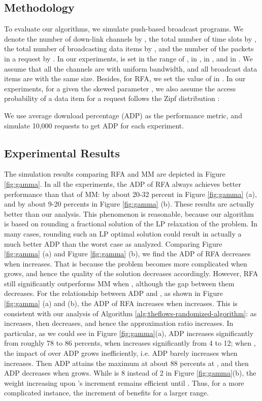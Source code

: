 \documentclass[11pt,english,onecolumn,draftcls]{IEEEtran}
\theoremstyle{plain}
\theoremstyle{plain}
\theoremstyle{plain}
\theoremstyle{plain}
\begin{document}
\subsection{Methodology}

To evaluate our algorithms, we simulate push-based broadcast programs.
We denote the number of down-link channels by , the total number
of time slots by , the total number of broadcasting data items
by , and the number of the packets in a request by . In our
experiments,  is set in the range of ,  in ,
 in , and  in . We assume that
all the channels are with uniform bandwidth, and all broadcast data
items are with the same size. Besides, for RFA, we set the value of
 in . In our experiments, for a given the skewed
parameter , we also assume the access probability of a data
item  for a request follows the Zipf distribution :




We use average download percentage (ADP) as the performance metric,
and simulate 10,000 requests to get ADP for each experiment.


\subsection{Experimental Results }

The simulation results comparing RFA and MM are depicted in Figure
\ref{fig:gamma}. In all the experiments, the ADP of RFA always achieves
better performance than that of MM: by about 20-32 percent in Figure
\ref{fig:gamma} (a), and by about 9-20 percents in Figure \ref{fig:gamma}
(b). These results are actually better than our analysis. This phenomenon
is reasonable, because our algorithm is based on rounding a fractional
solution of the LP relaxation of the problem. In many cases, rounding
such an LP optimal solution could result in actually a much better
ADP than the worst case as analyzed. Comparing Figure \ref{fig:gamma}
(a) and Figure \ref{fig:gamma} (b), we find the ADP of RFA decreases
when  increases. That is because the problem becomes more complicated
when  grows, and hence the quality of the solution decreases accordingly.
However, RFA still significantly outperforms MM when , although
the gap between them decreases. For the relationship between ADP and
, as shown in Figure \ref{fig:gamma} (a) and (b), the ADP
of RFA increases when  increases. This is consistent with
our analysis of Algorithm \ref{alg:theflows-randomized-algorithm}:
as  increases,  then decreases,
and hence the approximation ratio  increases.
In particular, as we could see in Figure \ref{fig:gamma}(a), ADP
increases significantly from roughly 78 to 86 percents, when 
increases significantly from 4 to 12; when , the impact
of  over ADP grows inefficiently, i.e. ADP barely increases
when  increases. Then ADP attains the maximum at about 88
percents at , and then ADP decreases when 
grows. While  is 8 instead of 2 in Figure \ref{fig:gamma}(b),
the weight increasing upon 's increment remains efficient
until . Thus, for a more complicated instance, the increment
of  benefits for a larger range.
\end{document}
